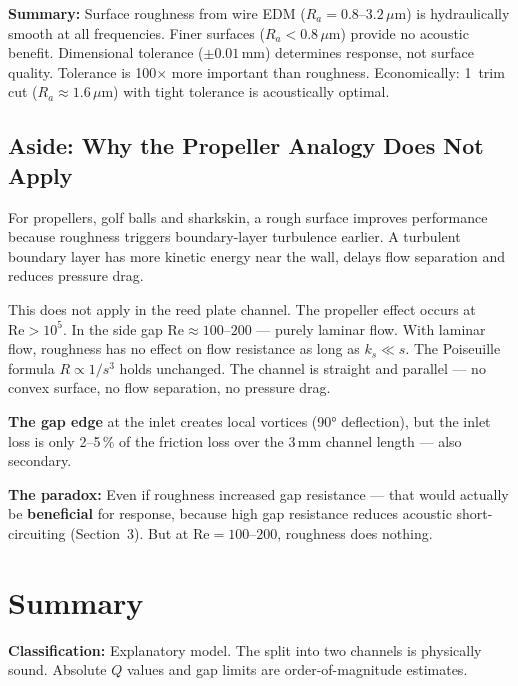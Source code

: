 \documentclass[11pt,a4paper]{article}
\begin{document}
\begin{keybox}
\textbf{Summary:} Surface roughness from wire EDM ($R_a = 0{.}8$--$3{.}2\,\mu$m) is hydraulically smooth at all frequencies. Finer surfaces ($R_a < 0{.}8\,\mu$m) provide no acoustic benefit. Dimensional tolerance ($\pm 0{.}01$\,mm) determines response, not surface quality. Tolerance is 100$\times$ more important than roughness. Economically: 1~trim cut ($R_a \approx 1{.}6\,\mu$m) with tight tolerance is acoustically optimal.
\end{keybox}

\subsection{Aside: Why the Propeller Analogy Does Not Apply}

For propellers, golf balls and sharkskin, a rough surface improves performance because roughness triggers boundary-layer turbulence earlier. A turbulent boundary layer has more kinetic energy near the wall, delays flow separation and reduces pressure drag.

This does not apply in the reed plate channel. The propeller effect occurs at $\text{Re} > 10^5$. In the side gap $\text{Re} \approx 100$--$200$ --- purely laminar flow. With laminar flow, roughness has no effect on flow resistance as long as $k_s \ll s$. The Poiseuille formula $R \propto 1/s^3$ holds unchanged. The channel is straight and parallel --- no convex surface, no flow separation, no pressure drag.

\textbf{The gap edge} at the inlet creates local vortices (90° deflection), but the inlet loss is only 2--5\,\% of the friction loss over the 3\,mm channel length --- also secondary.

\textbf{The paradox:} Even if roughness increased gap resistance --- that would actually be \textbf{beneficial} for response, because high gap resistance reduces acoustic short-circuiting (Section~3). But at $\text{Re} = 100$--$200$, roughness does nothing.

\section{Summary}

\begin{warnbox}
\textbf{Classification:} Explanatory model. The split into two channels is physically sound. Absolute $Q$ values and gap limits are order-of-magnitude estimates.
\end{warnbox}
\end{document}

